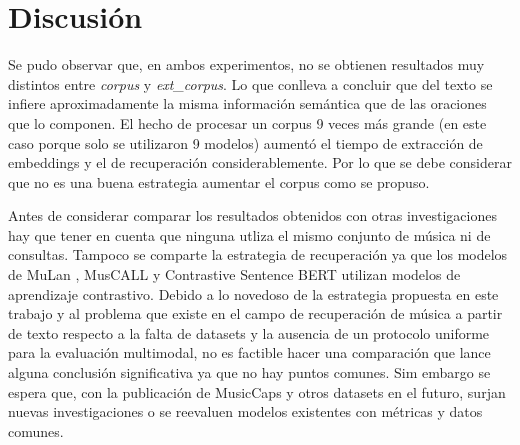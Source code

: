 \section{Discusión}
\label{sec:final-discution}
Se pudo observar que, en ambos experimentos, no se obtienen resultados muy distintos entre \textit{corpus} y \textit{ext\_corpus}. Lo que conlleva a concluir que del texto se infiere aproximadamente la misma información semántica que de las oraciones que lo componen. El hecho de procesar un corpus 9 veces más grande (en este caso porque solo se utilizaron 9 modelos) aumentó el tiempo de extracción de embeddings y el de recuperación considerablemente. Por lo que se debe considerar que no es una buena estrategia aumentar el corpus como se propuso. 

Antes de considerar comparar los resultados obtenidos con otras investigaciones hay que tener en cuenta que ninguna utliza el mismo conjunto de música ni de consultas. Tampoco se comparte la estrategia de recuperación ya que los modelos de MuLan \cite{Huang2022MuLanAJ}, MusCALL \cite{Manco2022ContrastiveAL} y Contrastive Sentence BERT \cite{Doh2022TowardUT} utilizan modelos de aprendizaje contrastivo. Debido a lo novedoso de la estrategia propuesta en este trabajo y al problema que existe en el campo de recuperación de música a partir de texto respecto a la falta de datasets y la ausencia de un protocolo uniforme para la evaluación multimodal, no es factible hacer una comparación que lance alguna conclusión significativa ya que no hay puntos comunes. Sim embargo se espera que, con la publicación de MusicCaps \cite{Agostinelli2023MusicLMGM} y otros datasets en el futuro, surjan nuevas investigaciones o se reevaluen modelos existentes con métricas y datos comunes. 
